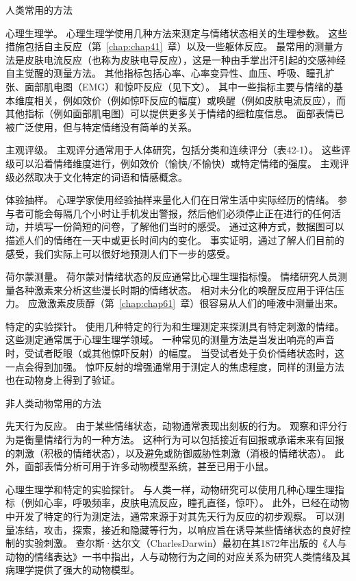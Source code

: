 \begin{proposition}[测量情绪的方法] \label{box:42_1}
	
	\quad \quad 人类常用的方法
	
	\quad \quad 心理生理学。
	心理生理学使用几种方法来测定与情绪状态相关的生理参数。
	这些措施包括自主反应（第~\ref{chap:chap41}~章）以及一些躯体反应。
	最常用的测量方法是皮肤电流反应（也称为皮肤电导反应），这是一种由手掌出汗引起的交感神经自主觉醒的测量方法。
	其他指标包括心率、心率变异性、血压、呼吸、瞳孔扩张、面部肌电图（EMG）和惊吓反应（见下文）。
	其中一些指标主要与情绪的基本维度相关，例如效价（例如惊吓反应的幅度）或唤醒（例如皮肤电流反应），而其他指标（例如面部肌电图）可以提供更多关于情绪的细粒度信息。
	面部表情已被广泛使用，但与特定情绪没有简单的关系。
	
	\quad \quad 主观评级。
	主观评分通常用于人体研究，包括分类和连续评分（表42-1）。
	这些评级可以沿着情绪维度进行，例如效价（愉快/不愉快）或特定情绪的强度。
	主观评级必然取决于文化特定的词语和情感概念。
	
	\quad \quad 体验抽样。
	心理学家使用经验抽样来量化人们在日常生活中实际经历的情绪。
	参与者可能会每隔几个小时让手机发出警报，然后他们必须停止正在进行的任何活动，并填写一份简短的问卷，了解他们当时的感受。
	通过这种方式，数据图可以描述人们的情绪在一天中或更长时间内的变化。
	事实证明，通过了解人们目前的感受，我们实际上可以很好地预测人们下一步的感受。
	
	\quad \quad 荷尔蒙测量。
	荷尔蒙对情绪状态的反应通常比心理生理指标慢。
	情绪研究人员测量各种激素来分析这些漫长时期的情绪状态。
	相对未分化的唤醒反应用于评估压力。
	应激激素皮质醇（第~\ref{chap:chap61}~章）很容易从人们的唾液中测量出来。
	
	\quad \quad 特定的实验探针。
	使用几种特定的行为和生理测定来探测具有特定刺激的情绪。
	这些测定通常属于心理生理学领域。
	一种常见的测量方法是当发出响亮的声音时，受试者眨眼（或其他惊吓反射）的幅度。
	当受试者处于负价情绪状态时，这一点会得到加强。
	惊吓反射的增强通常用于测定人的焦虑程度，同样的测量方法也在动物身上得到了验证。
	
	\quad \quad 非人类动物常用的方法
	
	\quad \quad 先天行为反应。
	由于某些情绪状态，动物通常表现出刻板的行为。
	观察和评分行为是衡量情绪行为的一种方法。
	这种行为可以包括接近有回报或承诺未来有回报的刺激（积极的情绪状态），以及避免或防御威胁性刺激（消极的情绪状态）。
	此外，面部表情分析可用于许多动物模型系统，甚至已用于小鼠。
	
	\quad \quad 心理生理学和特定的实验探针。
	与人类一样，动物研究可以使用几种心理生理指标（例如心率，呼吸频率，皮肤电流反应，瞳孔直径，惊吓）。
	此外，已经在动物中开发了特定的行为测定法，通常来源于对其先天行为反应的初步观察。
	可以测量冻结，攻击，探索，接近和隐藏等行为，以响应旨在诱导某些情绪状态的良好控制的实验刺激。
	查尔斯·达尔文（CharlesDarwin）最初在其1872年出版的《人与动物的情绪表达》一书中指出，人与动物行为之间的对应关系为研究人类情绪及其病理学提供了强大的动物模型。
	
\end{proposition}


